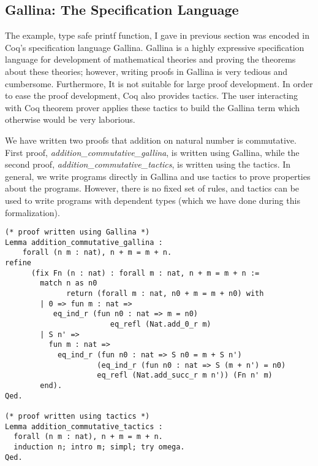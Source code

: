  \subsection{Gallina: The Specification Language}
 \label{sec:gallina}
  The example, type safe printf function, I gave in previous 
  section was encoded in Coq's specification language Gallina. 
  Gallina is a highly expressive specification 
  language for development of mathematical theories and proving the    
  theorems about these  theories; however, writing proofs in Gallina
  is very tedious and cumbersome. Furthermore, It is not suitable for large proof 
  development. In order to ease the proof development, Coq also provides 
  tactics.  The user interacting with Coq theorem prover applies these 
  tactics to build the  Gallina term  which otherwise would  
  be very laborious.
  
 We have written two proofs that addition on natural number is commutative. 
 First proof, \textit{addition\_commutative\_gallina}, is written using 
 Gallina, while the second proof, \textit{addition\_commutative\_tactics}, is written 
 using the tactics.  In general, we write programs directly in Gallina and use tactics 
 to prove properties about the programs. However, there is no fixed set of rules, and tactics 
 can be used to write programs with dependent types (which we have done during this
 formalization).
 
\begin{verbatim}
(* proof written using Gallina *)
Lemma addition_commutative_gallina : 
    forall (n m : nat), n + m = m + n.
refine
      (fix Fn (n : nat) : forall m : nat, n + m = m + n :=
        match n as n0 
              return (forall m : nat, n0 + m = m + n0) with
        | 0 => fun m : nat => 
           eq_ind_r (fun n0 : nat => m = n0) 
                     	eq_refl (Nat.add_0_r m)
        | S n' =>
          fun m : nat =>
            eq_ind_r (fun n0 : nat => S n0 = m + S n')
                     (eq_ind_r (fun n0 : nat => S (m + n') = n0) 
                     eq_refl (Nat.add_succ_r m n')) (Fn n' m)
        end).
Qed.

(* proof written using tactics *)
Lemma addition_commutative_tactics :
  forall (n m : nat), n + m = m + n.
  induction n; intro m; simpl; try omega.
Qed.
\end{verbatim}



